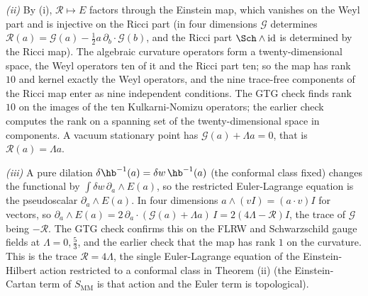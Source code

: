 \emph{(ii)} By (i), $\mathcal{R} \mapsto E$ factors through the Einstein map, which vanishes on the Weyl part and is injective on the Ricci part (in four dimensions $\mathcal{G}$ determines $\mathcal{R}(a) = \mathcal{G}(a) - \tfrac12 a\,\partial_{b}\cdot\mathcal{G}(b)$, and the Ricci part $\Sch\wedge\mathrm{id}$ is determined by the Ricci map). The algebraic curvature operators form a twenty-dimensional space, the Weyl operators ten of it and the Ricci part ten; so the map has rank $10$ and kernel exactly the Weyl operators, and the nine trace-free components of the Ricci map enter as nine independent conditions. The GTG check finds rank $10$ on the images of the ten Kulkarni-Nomizu operators; the earlier check computes the rank on a spanning set of the twenty-dimensional space in components. A vacuum stationary point has $\mathcal{G}(a) + \Lambda a = 0$, that is $\mathcal{R}(a) = \Lambda a$.

\emph{(iii)} A pure dilation $\delta\hb^{-1}(a) = \delta w\,\hb^{-1}(a)$ (the conformal class fixed) changes the functional by $\int\delta w\,\partial_{a}\wedge E(a)$, so the restricted Euler-Lagrange equation is the pseudoscalar $\partial_{a}\wedge E(a)$. In four dimensions $a\wedge(vI) = (a\cdot v)I$ for vectors, so $\partial_{a}\wedge E(a) = 2\,\partial_{a}\cdot(\mathcal{G}(a) + \Lambda a)\,I = 2(4\Lambda - \mathcal{R})I$, the trace of $\mathcal{G}$ being $-\mathcal{R}$. The GTG check confirms this on the FLRW and Schwarzschild gauge fields at $\Lambda = 0, \tfrac53$, and the earlier check that the map has rank $1$ on the curvature. This is the trace $\mathcal{R} = 4\Lambda$, the single Euler-Lagrange equation of the Einstein-Hilbert action restricted to a conformal class in Theorem (ii) (the Einstein-Cartan term of $S_{\mathrm{MM}}$ is that action and the Euler term is topological).

